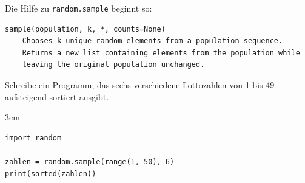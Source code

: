\question[3]
Die Hilfe zu \texttt{random.sample} beginnt so:
\begin{lstlisting}[language={}]
sample(population, k, *, counts=None)
    Chooses k unique random elements from a population sequence.
    Returns a new list containing elements from the population while
    leaving the original population unchanged.
\end{lstlisting}
Schreibe ein Programm, das sechs verschiedene Lottozahlen von 1 bis 49 aufsteigend sortiert ausgibt.
\begin{solutionbox}{3cm}
\begin{lstlisting}
import random

zahlen = random.sample(range(1, 50), 6)
print(sorted(zahlen))
\end{lstlisting}
\end{solutionbox}
